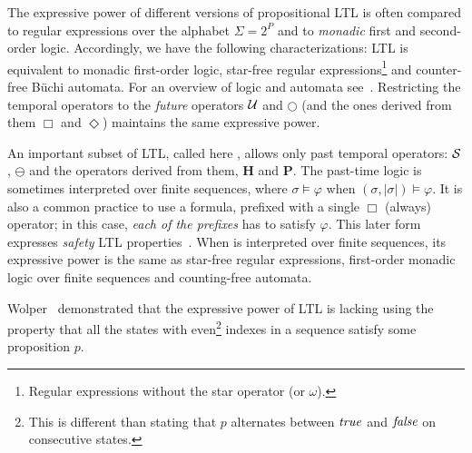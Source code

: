 The expressive power of different versions of propositional LTL is often compared to regular expressions
over the alphabet $\Sigma = 2^P$ and to  {\em monadic} first and second-order logic.
 Accordingly, we have the following characterizations:
LTL is equivalent to monadic first-order logic,  star-free regular expressions\footnote{Regular expressions without the star operator (or $\omega$).} and counter-free B\"{u}chi automata.
For an overview of logic and automata see~\cite{Thomas}.
Restricting the temporal operators to the {\em future}  operators $\mathbin{\mathcal{U}}$ and $\bigcirc$
(and the ones derived from them $\Box$ and $\Diamond$)
maintains the same expressive power.

An important subset of LTL, called here \PLTL{}, allows only past temporal
operators: ${\cal S}$, $\ominus$ and the operators derived
from them, $\mathbf{H}$ and $\mathbf{P}$. The past-time logic is sometimes interpreted over finite sequences, 
where $\sigma \models \varphi$ when $( \sigma , | \sigma | ) \models \varphi$.
It is also a common practice to use a \PLTL{} formula, prefixed with  a single $\Box$ (always) operator; in this case, {\em each of the prefixes} has to satisfy $\varphi$. This later
form expresses {\em safety} LTL properties~\cite{AS}.
When \PLTL{} is interpreted over finite sequences, its
expressive power is the same as star-free regular expressions, first-order monadic logic over finite sequences and counting-free automata.


\label{sec:extending-prop-ltl}



Wolper~\cite{Wolper} demonstrated that the expressive power of LTL is lacking using
the property that all the states with even\footnote{This is
different than stating that $p$ alternates between $\mathit{true}$ and $\mathit{false}$ on consecutive states.} indexes in a sequence
satisfy some proposition $p$.

